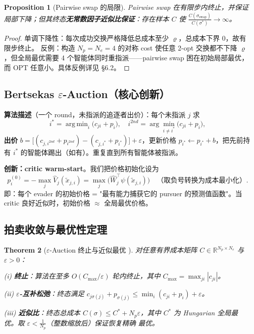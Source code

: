 \documentclass[11pt,a4paper]{article}
\DeclareMathOperator*{\argmin}{arg\,min}
\newcommand{\R}{\mathbb{R}}
\newtheorem{theorem}{Theorem}
\newtheorem{proposition}[theorem]{Proposition}
\theoremstyle{remark}
\begin{document}
\begin{proposition}[Pairwise swap 的局限]\label{prop:swap_local}
Pairwise swap 在有限步内终止，并保证局部下降；但其终态\textbf{无常数因子近似比保证}：存在样本 $C$ 使 $\frac{C(\sigma_{\text{swap}})}{C(\sigma^*)}\to\infty$。
\end{proposition}

\begin{proof}
单调下降性：每次成功交换严格降低总成本至少 $\varrho$，总成本下界 $0$，故有限步终止。
反例：构造 $N_p=N_e=4$ 的对称 cost 使任意 2-opt 交换都不下降 $\varrho$，但全局最优需要 4 个智能体同时重指派——pairwise swap 困在初始局部最优，而 OPT 任意小。具体反例详见 \cite{lawler1976optimization} \S 6.2。
\end{proof}

\subsection{Bertsekas $\varepsilon$-Auction（核心创新）}

\textbf{算法描述}（一个 round，未指派的追逐者出价）：每个未指派 $j$ 求
\begin{equation}
i^* = \argmin_{i}\big(c_{ji}+p_i\big),\quad
i^{2nd}=\arg\!\!\!\min_{i\ne i^*}\big(c_{ji}+p_i\big),
\end{equation}
\textbf{出价} $b=\big[(c_{j,i^{2nd}}+p_{i^{2nd}})-(c_{j,i^*}+p_{i^*})\big]+\varepsilon$，更新价格 $p_{i^*}\leftarrow p_{i^*}+b$，把先前持有 $i^*$ 的智能体踢出（如有）。重复直到所有智能体被指派。

\textbf{创新：critic warm-start}。我们把价格初始化设为
\begin{equation}
p_i^{(0)} = -\max_j \hat V_j(\tilde x_{j,i})
=\max_j\big(\hat W_j^\top\psi(\tilde x_{j,i})\big)
\quad\text{（取负号转换为成本最小化）}.
\label{eq:critic_warm_start}
\end{equation}
即：每个 evader 的初始价格 = "最有能力捕获它的 pursuer 的预测值函数"。当 critic 良好近似时，初始价格 $\approx$ 全局最优价格。

\subsection{拍卖收敛与最优性定理}

\begin{theorem}[$\varepsilon$-Auction 终止与近似最优 \cite{bertsekas1992auction}]\label{thm:auction}
对任意有界成本矩阵 $C\in\R^{N_p\times N_e}$ 与 $\varepsilon>0$：

(i) \textbf{终止}：算法在至多 $O(C_{\max}/\varepsilon)$ 轮内终止，其中 $C_{\max}=\max_{ji}|c_{ji}|$。

(ii) \textbf{$\varepsilon$-互补松弛}：终态满足 $c_{j\sigma(j)}+p_{\sigma(j)}\le \min_i(c_{ji}+p_i)+\varepsilon$。

(iii) \textbf{近似比}：终态总成本 $C(\sigma)\le C^*+N_p\varepsilon$，其中 $C^*$ 为 Hungarian 全局最优。取 $\varepsilon<\frac{1}{N_p}$（整数缩放后）保证恢复\emph{精确} 最优。
\end{theorem}
\end{document}

